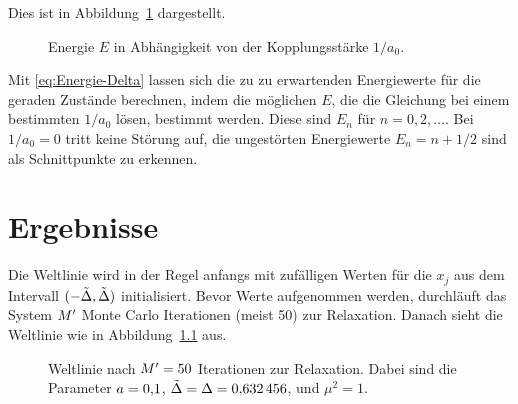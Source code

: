 Dies ist in Abbildung~\ref{fig:E_a0} dargestellt.

\begin{figure}[htbp]
    \centering
    \caption{%
        Energie $E$ in Abhängigkeit von der Kopplungsstärke $1/a_0$.
    }
    \label{fig:E_a0}
\end{figure}

Mit \eqref{eq:Energie-Delta} lassen sich die zu zu erwartenden Energiewerte für
die geraden Zustände berechnen, indem die möglichen $E$, die die Gleichung bei
einem bestimmten $1/a_0$ lösen, bestimmt werden. Diese sind $E_n$ für $n = 0,
2, \ldots$. Bei $1/a_0 = 0$ tritt keine Störung auf, die ungestörten
Energiewerte $E_n = n + 1/2$ sind als Schnittpunkte zu erkennen.




\chapter{Ergebnisse}

Die Weltlinie wird in der Regel anfangs mit zufälligen Werten für die $x_j$ aus
dem Intervall $(-\tilde \Delta, \tilde \Delta)$ initialisiert. Bevor
Werte aufgenommen werden, durchläuft das System $M'$ Monte Carlo
Iterationen (meist \num{50}) zur Relaxation. Danach sieht die Weltlinie wie in
Abbildung~\ref{fig:relaxiert} aus.

\begin{figure}[htbp]
    \centering
    \caption{%
        Weltlinie nach $M' = \num{50}$ Iterationen zur Relaxation.
        Dabei sind die Parameter $a = \num{0.1}$, $\tilde \Delta
        = \Delta = \num{0.632456}$, und $\mu^2 = \num{1}$.
    }
    \label{fig:relaxiert}
\end{figure}

